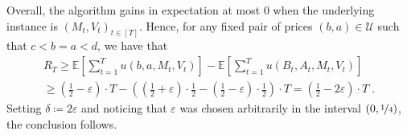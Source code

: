 \documentclass[final,12pt]{colt2025}
\newcommand{\cF}{\mathcal{F}}
\newcommand{\cU}{\mathcal{U}}
\newcommand{\E}{\mathbb{E}}
\newcommand{\Pb}{\mathbb{P}}
\newcommand{\e}{\varepsilon}
\newcommand{\lrb}[1]{\left(#1\right)}
\newcommand{\lsb}[1]{\left[#1\right]}
\newcommand{\one}[1]{\mathbb{I}\{#1\}}
\newcommand{\labs}[1]{\left\lvert#1\right\rvert}
\newcommand{\util}{u}
\newcommand{\nP}{M}
\newcommand{\nZ}{V}
\newcommand{\nB}{B}
\newcommand{\nb}{b}
\newcommand{\nS}{A}
\newcommand{\ns}{a}
\begin{document}
    Overall, the algorithm gains in expectation at most $0$ when the underlying instance is $(\nP_t,\nZ_t)_{t \in [T]}$.
    Hence, for any fixed pair of prices $(\nb, \ns) \in \cU$ such that $c <\nb = \ns < d$, we have that
    \begin{multline*}
            R_T
        \ge
            \E\lsb{\sum_{t=1}^T \util(\nb,\ns,\nP_t,\nZ_t)} - \E \lsb{\sum_{t=1}^T \util(\nB_t,\nS_t,\nP_t,\nZ_t)}
        \\ \ge
            \lrb{\frac{1}{2}-\e}\cdot T - \lrb{ \lrb{\frac{1}{2} + \e} \cdot \frac{1}{2} - \lrb{\frac{1}{2} - \e} \cdot \frac{1}{2}} \cdot T
        =
            \lrb{\frac{1}{2} - 2\e} \cdot T \;.
    \end{multline*}
Setting $\delta \coloneqq 2 \e$ and noticing that $\e$ was chosen arbitrarily in the interval $(0, \nicefrac{1}{4})$, the conclusion follows.

\end{document}
